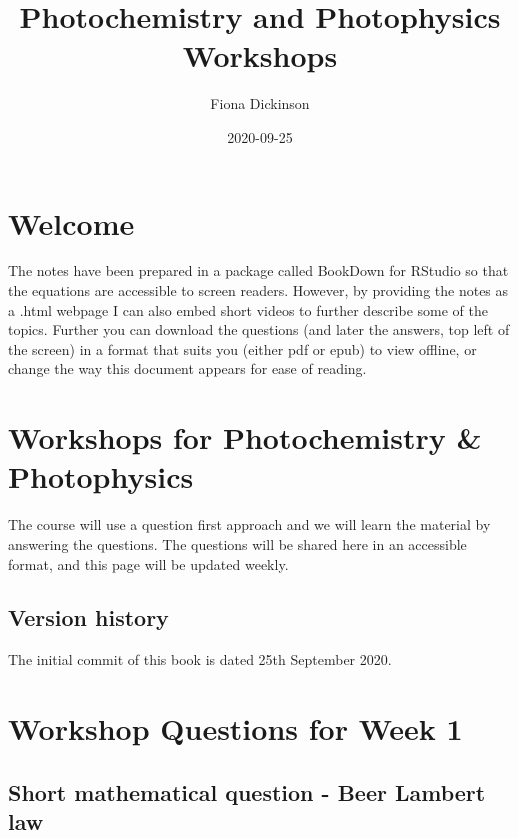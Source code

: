 \documentclass[
]{book}
\title{Photochemistry and Photophysics Workshops}
\author{Fiona Dickinson}
\date{2020-09-25}
\begin{document}
\maketitle

{
\setcounter{tocdepth}{1}
\tableofcontents
}
\hypertarget{welcome}{%
\chapter*{Welcome}\label{welcome}}

The notes have been prepared in a package called BookDown for RStudio so that the equations are accessible to screen readers. However, by providing the notes as a .html webpage I can also embed short videos to further describe some of the topics. Further you can download the questions (and later the answers, top left of the screen) in a format that suits you (either pdf or epub) to view offline, or change the way this document appears for ease of reading.

\hypertarget{ch:WorkIntro}{%
\chapter{Workshops for Photochemistry \& Photophysics}\label{ch:WorkIntro}}

The course will use a question first approach and we will learn the material by answering the questions. The questions will be shared here in an accessible format, and this page will be updated weekly.

\hypertarget{version-history}{%
\section*{Version history}\label{version-history}}

The initial commit of this book is dated 25th September 2020.

\hypertarget{ch:Workshop1}{%
\chapter{Workshop Questions for Week 1}\label{ch:Workshop1}}

\hypertarget{sec:BeerLambert}{%
\section{Short mathematical question - Beer Lambert law}\label{sec:BeerLambert}}
\end{document}
